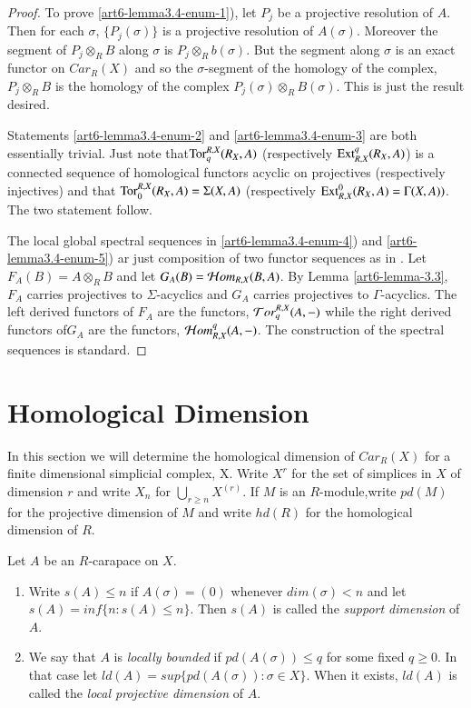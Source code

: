 \begin{proof}
To prove \ref{art6-lemma3.4-enum-1}), let ${P_{j}}$ be a projective resolution of $A$. Then for each $\sigma$, $\{P_{j}(\sigma)\}$ is a projective resolution of $A(\sigma)$. Moreover the segment of $P_{j}\otimes_{R}B$ along $\sigma$ is $P_{j}\otimes_{R}b(\sigma)$. But the segment along $\sigma$ is an exact functor on $C ar_{R}(X)$ and so the $\sigma$-segment of the homology of the complex, $P_{j}\otimes_{R}B$ is the homology of the complex $P_{j}(\sigma) \otimes_{R}B(\sigma)$. This is just the result desired.

Statements \ref{art6-lemma3.4-enum-2} and \ref{art6-lemma3.4-enum-3} are both essentially trivial. Just note that\break $\operatorname{Tor}_{q}^{R, X}(R_{X}, A)$ (respectively $\operatorname{Ext}_{R,X}^{q}(R_{X}, A)$) is a connected sequence of homological functors acyclic on projectives (respectively injectives) and that $\operatorname{Tor}_{0}^{R,X}(R_{X},A)=\Sigma(X, A)$ (respectively $\operatorname{Ext}_{R,X}^{0}(R_{X},A) = \Gamma(X,A))$. The two statement follow.

The local global spectral sequences in \ref{art6-lemma3.4-enum-4}) and \ref{art6-lemma3.4-enum-5}) ar just composition of two functor sequences as in \cite{art6-keyGr}. Let $F_{A}(B) = A\otimes_{R}B$ and let $G_{A}(B) = \mathcal{H} om_{R,X}(B,A)$. By Lemma \ref{art6-lemma-3.3}, $F_{A}$ carries projectives to $\Sigma$-acyclics and $G_{A}$ carries projectives to $\Gamma$-acyclics. The left derived functors of $F_{A}$ are the functors, $\mathcal{T} or_{q}^{R,X}(A,-)$ while the right derived functors of$G_{A}$ are the functors, $\mathcal{H} om_{R,X}^{q}(A, -)$. The construction of the spectral sequences is standard.
\end{proof}

\section{Homological Dimension}\label{art6-sec-4}

In this section we will determine the homological dimension of $C ar_{R}(X)$ for a finite dimensional simplicial complex, X. Write $X^{r}$ for the set of simplices in $X$ of dimension $r$ and write $X_{n}$ for $\bigcup_{r\geq n}X^{(r)}$. If $M$ is an $R$-module,write $pd(M)$ for the projective dimension of $M$ and write $hd(R)$ for the homological dimension of $R$. 

\begin{defin}\label{art6-defin-1}
Let $A$ be an $R$-carapace on $X$.
    \begin{enumerate}[(1)]
    \item Write $s(A)\leq n$ if $A(\sigma) = (0)$ whenever $dim(\sigma) < n$ and let $s(A) = inf\{n: s(A) \leq n\}$. Then $s(A)$ is called the \textit{support dimension} of $A$.\label{art6-defin1-enum-1}
    \item We say that $A$ is \textit{locally bounded} if $pd(A(\sigma)) \leq q$ for some fixed $q \geq 0$. In that case let $ld(A)=sup\{pd(A(\sigma)) : \sigma \in X\}$. When it exists, $ld(A)$ is called the \textit{local projective dimension} of $A$.\label{art6-defin1-enum-2}
    \end{enumerate}
\end{defin}

